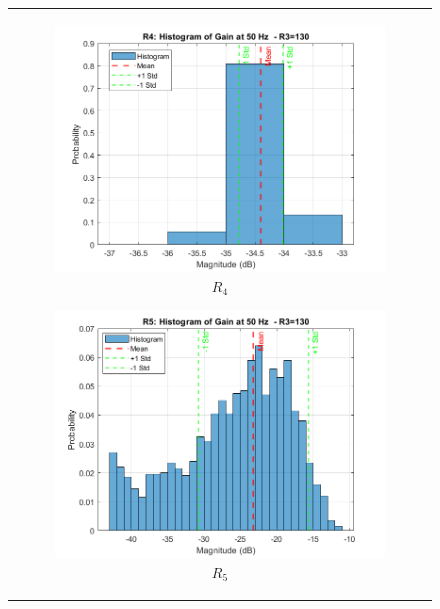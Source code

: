 \documentclass[hidelinks,12pt]{article}
\begin{document}
\begin{figure}[!h]
{\begin{tabular}{c}
				\begin{subfigure}[h]{0.4\textwidth}
					\centering
					\includegraphics[width=\textwidth]{figures/r3=130/r4.png}
					\caption{$R_4$}
				\end{subfigure}
				\hfill
				\begin{subfigure}[h]{0.4\textwidth}
					\centering
					\includegraphics[width=\textwidth]{figures/r3=130/r5.png}
					\caption{$R_5$}
				\end{subfigure}
				\hfill
				\begin{subfigure}[h]{0.4\textwidth}
					\centering

\end{subfigure}
\end{tabular}}
\end{figure}
\end{document}

